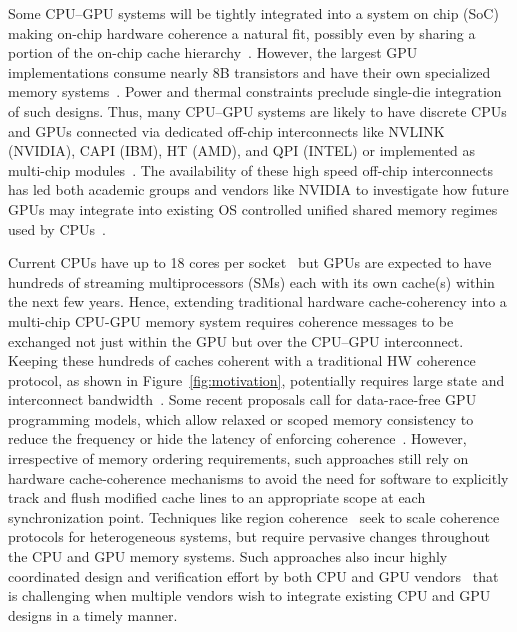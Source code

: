 Some CPU--GPU systems will be tightly integrated into a system on chip (SoC) making on-chip 
hardware coherence a natural fit, possibly even by sharing a portion of the on-chip 
cache hierarchy~\cite{HSA,AMDAPU,Hechtman2014}.  However, the largest GPU 
implementations consume nearly 8B transistors and have their own 
specialized memory systems~\cite{NVIDIA8BILLION}.  
Power and thermal constraints preclude single-die integration of such designs. 
Thus, many CPU--GPU systems are likely to have 
discrete CPUs and GPUs connected via dedicated off-chip interconnects like 
NVLINK (NVIDIA), CAPI (IBM), HT (AMD), and QPI (INTEL) or implemented as 
multi-chip modules~\cite{NVLINK,CAPI,AMDHT,INTELQPI,Chen92}. The availability of these
high speed off-chip interconnects has led both academic groups and vendors like NVIDIA
to investigate how future GPUs may integrate into existing OS controlled 
unified shared memory regimes used by CPUs~\cite{Pichai2014,Power2014,Agarwal2015,Agarwal2015b}.

Current CPUs have up to 18 cores per socket~\cite{INTELXEONE5V3} but GPUs are 
expected to have hundreds of streaming multiprocessors (SMs) each with its own cache(s) within 
the next few years. Hence, extending traditional hardware cache-coherency into a multi-chip 
CPU-GPU memory system requires coherence messages to be exchanged not just within the GPU but
over the CPU--GPU interconnect. Keeping these hundreds of caches coherent with a traditional HW
coherence protocol, as shown in
Figure~\ref{fig:motivation}, potentially requires large state and interconnect 
bandwidth~\cite{Kelm2010,johnson2011}. 
Some recent proposals call for data-race-free GPU programming models, which
allow relaxed or scoped memory consistency to reduce the frequency or hide the
latency of enforcing coherence~\cite{Hechtman2014}.  However, irrespective of 
memory ordering requirements, such approaches still rely on hardware cache-coherence mechanisms
to  avoid the need for software to explicitly track and flush modified cache lines to an
appropriate scope at each synchronization point. Techniques like region coherence~\cite{Power2013} 
seek to scale coherence protocols for heterogeneous systems, but require
pervasive changes throughout the CPU and GPU memory systems. Such approaches
also incur highly coordinated design and verification effort by both CPU and GPU
vendors~\cite{Hong2012} that is challenging when multiple vendors wish to integrate
existing CPU and GPU designs in a timely manner.


